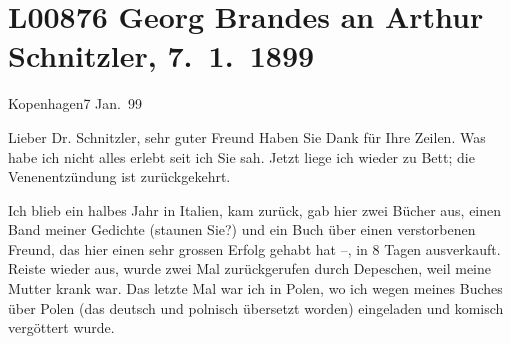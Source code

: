 

\section[Georg Brandes an Arthur Schnitzler, 7. 1. 1899]{L00876 Georg Brandes an Arthur Schnitzler, 7. 1. 1899}
\nopagebreak{}
\rehead{ }\normalsize\beginnumbering{}
\toendnotes[C]{\smallbreak\pagebreak[2]}
\toendnotes[C]{\smallbreak}
\pstart
           \raggedleft{}{\pb}Kopenhagen7 Jan. 99\pend
           
\pstart{}Lieber Dr. Schnitzler, sehr guter Freund\pend\vspace{0.5em}
\pstart
           Haben Sie Dank für Ihre Zeilen. Was habe ich nicht alles erlebt seit ich Sie sah.
               Jetzt liege ich wieder zu Bett; die Venenentzündung ist zurückgekehrt.\pend
           
\pstart
           Ich blieb ein halbes Jahr in Italien, kam
               zurück, gab hier zwei Bücher aus, einen Band meiner Gedichte (staunen Sie?) und ein Buch über einen verstorbenen Freund, das
               hier einen sehr grossen Erfolg gehabt hat –, in 8 Tagen ausverkauft. Reiste wieder
               aus, wurde zwei Mal zurückgerufen durch Depeschen, {\pb}weil meine Mutter krank war. Das letzte Mal war ich in
                  Polen, wo ich wegen meines Buches über Polen (das deutsch und polnisch
               übersetzt worden) eingeladen und komisch vergöttert wurde.\pend
           

